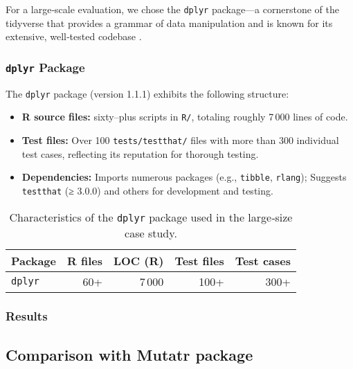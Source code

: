For a large‐scale evaluation, we chose the \texttt{dplyr} package—a cornerstone of the tidyverse that provides a grammar of data manipulation and is known for its extensive, well‐tested codebase \cite{wickham2023dplyr}.

\subsubsection{\texttt{dplyr} Package}

The \texttt{dplyr} package (version 1.1.1) exhibits the following structure:

\begin{itemize}
  \item \textbf{R source files:}  sixty–plus scripts in \texttt{R/}, totaling roughly 7\,000 lines of code.
  \item \textbf{Test files:} Over 100 \texttt{tests/testthat/} files with more than 300 individual test cases, reflecting its reputation for thorough testing.
  \item \textbf{Dependencies:} Imports numerous packages (e.g., \texttt{tibble}, \texttt{rlang}); Suggests \texttt{testthat} (≥ 3.0.0) and others for development and testing.
\end{itemize}

\begin{table}[htbp]
  \centering
  \begin{tabular}{lrrrr}
    \toprule
    Package   & R files & LOC (R) & Test files & Test cases \\
    \midrule
    \texttt{dplyr} & 60+     & 7\,000    & 100+       & 300+       \\
    \bottomrule
  \end{tabular}
  \caption{Characteristics of the \texttt{dplyr} package used in the large‐size case study.}
  \label{tab:dplyr-metrics}
\end{table}

\subsubsection{Results}

\subsection{Comparison with Mutatr package}

